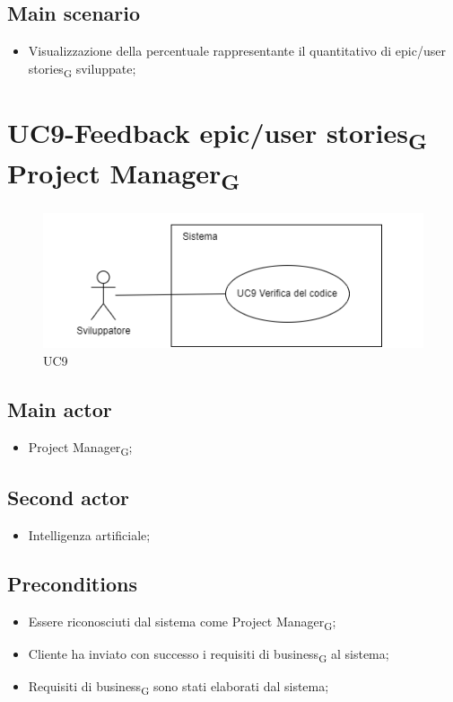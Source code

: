 \documentclass{article}
\begin{document}
    \subsection*{Main scenario}
        
        \begin{itemize}
            \item Visualizzazione della percentuale rappresentante il quantitativo di epic/user stories\textsubscript{G} sviluppate;
        \end{itemize}
        

\section{UC9-Feedback epic/user stories\textsubscript{G} Project Manager\textsubscript{G}}
    \begin{figure}[h]
      \centering
      \includegraphics{./imgUML/UC9.png}
    \caption{UC9}      
      \label{fig:UC9}
    \end{figure}
    \subsection*{Main actor}
    \begin{itemize}
        \item Project Manager\textsubscript{G};
    \end{itemize}
    \subsection{Second actor}
    \begin{itemize}
        \item Intelligenza artificiale;
    \end{itemize}
    
    \subsection*{Preconditions}
        \begin{itemize}
            \item Essere riconosciuti dal sistema come Project Manager\textsubscript{G};
            \item Cliente ha inviato con successo i requisiti di business\textsubscript{G} al sistema;
            \item Requisiti di business\textsubscript{G} sono stati elaborati dal sistema;
        \end{itemize}
        
\end{document}
